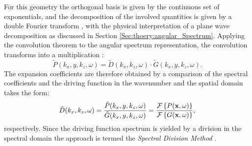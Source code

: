 For this geometry the orthogonal basis is given by the continuous set of exponentials, and the decomposition of the involved quantities is given by a double Fourier transform \cite{Ahrens2012, Arfken2005,Schultz2014:Comparing_approaches}, with the physical interpretation of a plane wave decomposition as discussed in Section \ref{Sec:thoery:angular_Spectrum}.
Applying the convolution theorem to the angular spectrum representation, the convolution transforms into a multiplication \cite{Girod2001}:
\begin{equation}
\tilde{P}(k_x,y,k_z, \omega) = \tilde{D}(k_x,k_z, \omega) \cdot \tilde{G}(k_x,y,k_z, \omega).
\end{equation}
%
The expansion coefficients are therefore obtained by a comparison of the spectral coefficients and the driving function in the wavenumber and the spatial domain takes the form:
\begin{equation}
\tilde{D}(k_x,k_z,\omega) = \frac{\tilde{P}(k_x,y,k_z, \omega)}{ \tilde{G}(k_x,y,k_z, \omega)} = 
\frac{\mathcal{F}\left\{ P(\mathbf{x},\omega) \right\} }
{  \mathcal{F}\left\{ G(\mathbf{x},\omega) \right\} },
\label{Eq:Theory:Dkxkz}
\end{equation}
respectively.
Since the driving function spectrum is yielded by a division in the spectral domain the approach is termed the \emph{Spectral Division Method} \cite{Ahrens2010a, Ahrens2012:Ambisonics_for_planar_linear, Ahrens2011:icassp, Ahrens2010:Ambisonics_w_planar_linear}.

